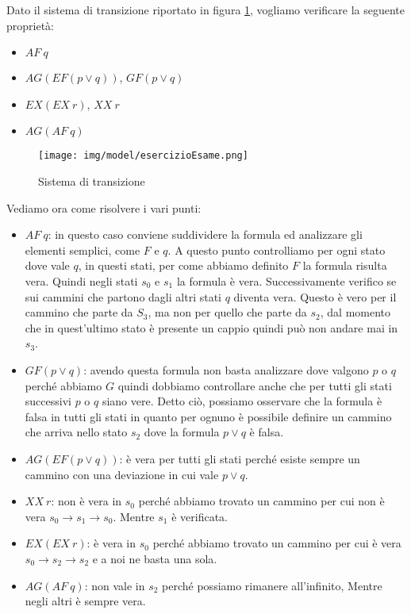 \begin{esempio} 
    Dato il sistema di transizione riportato in figura \ref{fig:esercizioEsame},
    vogliamo verificare la seguente proprietà:
    \begin{itemize}
        \item $AF \ q$
        \item $AG (EF (p \lor q))$, $GF(p \lor q)$
        \item $EX (EX \ r)$, $XX \ r$
        \item $AG (AF \ q)$
    \end{itemize}
    \begin{figure}[!ht]
        \centering
        \texttt{[image: img/model/esercizioEsame.png]}
        \caption{Sistema di transizione}
        \label{fig:esercizioEsame}
    \end{figure}
    Vediamo ora come risolvere i vari punti:
    \begin{itemize}
        \item $AF \ q$: in questo caso conviene suddividere la formula ed
              analizzare gli elementi semplici, come $F$ e $q$. A questo punto
              controlliamo per ogni stato dove vale $q$, in questi stati, per
              come abbiamo definito $F$ la formula risulta vera. Quindi negli
              stati $s_0$ e $s_1$ la formula è vera. Successivamente verifico se
              sui cammini che partono dagli altri stati $q$ diventa vera. Questo
              è vero per il cammino che parte da $S_3$, ma non per quello che parte
              da $s_2$, dal momento che in quest'ultimo stato è presente un
              cappio quindi può non andare mai in $s_3$.
        \item $GF(p \lor q)$: avendo questa formula non basta analizzare dove
              valgono $p$ o $q$ perché abbiamo $G$ quindi dobbiamo controllare
              anche che per tutti gli stati successivi $p$ o $q$ siano vere.
              Detto ciò, possiamo osservare che la formula è falsa in tutti gli
              stati in quanto per ognuno è possibile definire un cammino che
              arriva nello stato $s_2$ dove la formula $p \lor q$ è falsa.
        \item $AG (EF (p \lor q))$: è vera per tutti gli stati perché esiste
              sempre un cammino con una deviazione in cui vale $p \lor q$.
        \item $XX \ r$: non è vera in $s_0$ perché abbiamo trovato un cammino
              per cui non è vera $s_0\to s_1\to s_0$. Mentre $s_1$ è verificata.
        \item $EX (EX \ r)$: è vera in $s_0$ perché abbiamo trovato un cammino
              per cui è vera $s_0\to s_2\to s_2$ e a noi ne basta una sola.
        \item $AG (AF \ q)$: non vale in $s_2$ perché possiamo rimanere
              all'infinito, Mentre negli altri è sempre vera.
    \end{itemize}
\end{esempio}

